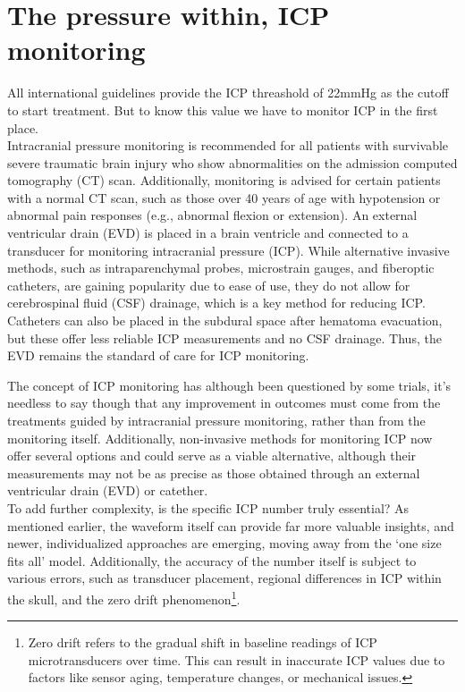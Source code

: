 \section[The pressure within, ICP monitoring]{The pressure within, ICP monitoring}
All international guidelines provide the ICP threashold of 22mmHg as the cutoff to start treatment. But to know this value we have to monitor ICP in the first place.\\

 Intracranial pressure monitoring is recommended for all patients with survivable severe traumatic brain injury who show abnormalities on the admission computed tomography (CT) scan. Additionally, monitoring is advised for certain patients with a normal CT scan, such as those over 40 years of age with hypotension or abnormal pain responses (e.g., abnormal flexion or extension).
An external ventricular drain (EVD) is placed in a brain ventricle and connected to a transducer for monitoring intracranial pressure (ICP). While alternative invasive methods, such as intraparenchymal probes, microstrain gauges, and fiberoptic catheters, are gaining popularity due to ease of use, they do not allow for cerebrospinal fluid (CSF) drainage, which is a key method for reducing ICP. Catheters can also be placed in the subdural space after hematoma evacuation, but these offer less reliable ICP measurements and no CSF drainage. Thus, the EVD remains the standard of care for ICP monitoring.

The concept of  ICP monitoring has although been questioned by some trials, it's needless to say though that any improvement in outcomes must come from the treatments guided by intracranial pressure monitoring, rather than from the monitoring itself\cite{stocchettiTraumaticIntracranialHypertension2014a}. Additionally, non-invasive methods for monitoring ICP now offer several options and could serve as a viable alternative, although their measurements may not be as precise as those obtained through an external ventricular drain (EVD) or catether.\\

To add further complexity, is the specific ICP number truly essential? As mentioned earlier, the waveform itself can provide far more valuable insights, and newer, individualized approaches are emerging, moving away from the ‘one size fits all’ model. Additionally, the accuracy of the number itself is subject to various errors, such as transducer placement, regional differences in ICP within the skull, and the zero drift phenomenon\footnote {Zero drift refers to the gradual shift in baseline readings of ICP microtransducers over time. This can result in inaccurate ICP values due to factors like sensor aging, temperature changes, or mechanical issues.\cite{liZeroDriftIntraventricular2015}}.

